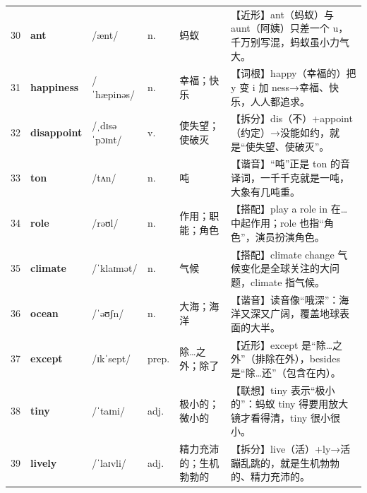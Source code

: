\documentclass[UTF8,a4paper,11pt,oneside]{ctexbook}
\newcommand{\cellword}[1]{{\bfseries\textcolor{wordcol}{#1}}}
\newcommand{\cellipa}[1]{{\footnotesize\textcolor{ipacol}{#1}}}
\newcommand{\cellpos}[1]{\textcolor{poscol}{#1}}
\newcommand{\cellno}[1]{\textcolor{volcolor!75!black}{#1}}
\begin{document}
{\begin{longtable}{@{}C{0.045\textwidth}L{0.155\textwidth}L{0.175\textwidth}C{0.070\textwidth}L{0.180\textwidth}L{0.282\textwidth}@{}}
\cellno{30} & \cellword{ant} & \cellipa{/ænt/} & \cellpos{n.} & 蚂蚁 & \textcolor{tagNear}{【近形】}ant（蚂蚁）与 aunt（阿姨）只差一个 u，千万别写混，蚂蚁虽小力气大。 \\
 \cellno{31} & \cellword{happiness} & \cellipa{/ˈhæpinəs/} & \cellpos{n.} & 幸福；快乐 & \textcolor{tagRoot}{【词根】}happy（幸福的）把 y 变 i 加 ness→\allowbreak{}幸福、快乐，人人都追求。 \\
\cellno{32} & \cellword{disappoint} & \cellipa{/ˌdɪsəˈpɔɪnt/} & \cellpos{v.} & 使失望；使破灭 & \textcolor{tagSplit}{【拆分】}dis（不）+appoint（约定）→\allowbreak{}没能如约，就是“使失望、使破灭”。 \\
 \cellno{33} & \cellword{ton} & \cellipa{/tʌn/} & \cellpos{n.} & 吨 & \textcolor{tagSound}{【谐音】}“吨”正是 ton 的音译词，一千千克就是一吨，大象有几吨重。 \\
\cellno{34} & \cellword{role} & \cellipa{/rəʊl/} & \cellpos{n.} & 作用；职能；角色 & \textcolor{tagColloc}{【搭配】}play a role in 在…中起作用；role 也指“角色”，演员扮演角色。 \\
 \cellno{35} & \cellword{climate} & \cellipa{/ˈklaɪmət/} & \cellpos{n.} & 气候 & \textcolor{tagColloc}{【搭配】}climate change 气候变化是全球关注的大问题，climate 指气候。 \\
\cellno{36} & \cellword{ocean} & \cellipa{/ˈəʊʃn/} & \cellpos{n.} & 大海；海洋 & \textcolor{tagSound}{【谐音】}读音像“哦深”：海洋又深又广阔，覆盖地球表面的大半。 \\
 \cellno{37} & \cellword{except} & \cellipa{/ɪkˈsept/} & \cellpos{prep.} & 除…之外；除了 & \textcolor{tagNear}{【近形】}except 是“除…之外”（排除在外），besides 是“除…还”（包含在内）。 \\
\cellno{38} & \cellword{tiny} & \cellipa{/ˈtaɪni/} & \cellpos{adj.} & 极小的；微小的 & \textcolor{tagAssoc}{【联想】}tiny 表示“极小的”：蚂蚁 tiny 得要用放大镜才看得清，tiny 很小很小。 \\
 \cellno{39} & \cellword{lively} & \cellipa{/ˈlaɪvli/} & \cellpos{adj.} & 精力充沛的；生机勃勃的 & \textcolor{tagSplit}{【拆分】}live（活）+ly→\allowbreak{}活蹦乱跳的，就是生机勃勃的、精力充沛的。 \\
\end{longtable}
}

\end{document}
